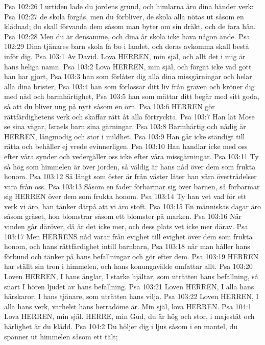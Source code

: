 Psa 102:26  I urtiden lade du jordens grund, och himlarna äro dina händer verk:
Psa 102:27  de skola förgås, men du förbliver, de skola alla nötas ut såsom en klädnad; du skall förvanda dem såsom man byter om sin dräkt, och de fara hän.
Psa 102:28  Men du är densamme, och dina år skola icke hava någon ände.
Psa 102:29  Dina tjänares barn skola få bo i landet, och deras avkomma skall bestå inför dig.
Psa 103:1  Av David. Lova HERREN, min själ, och allt det i mig är hans heliga namn.
Psa 103:2  Lova HERREN, min själ, och förgät icke vad gott han har gjort,
Psa 103:3  han som förlåter dig alla dina missgärningar och helar alla dina brister,
Psa 103:4  han som förlossar ditt liv från graven och kröner dig med nåd och barmhärtighet,
Psa 103:5  han som mättar ditt begär med sitt goda, så att du bliver ung på nytt såsom en örn.
Psa 103:6  HERREN gör rättfärdighetens verk och skaffar rätt åt alla förtryckta.
Psa 103:7  Han lät Mose se sina vägar, Israels barn sina gärningar.
Psa 103:8  Barmhärtig och nådig är HERREN, långmodig och stor i mildhet.
Psa 103:9  Han går icke ständigt till rätta och behåller ej vrede evinnerligen.
Psa 103:10  Han handlar icke med oss efter våra synder och vedergäller oss icke efter våra missgärningar.
Psa 103:11  Ty så hög som himmelen är över jorden, så väldig är hans nåd över dem som frukta honom.
Psa 103:12  Så långt som öster är från väster låter han våra överträdelser vara från oss.
Psa 103:13  Såsom en fader förbarmar sig över barnen, så förbarmar sig HERREN över dem som frukta honom.
Psa 103:14  Ty han vet vad för ett verk vi äro, han tänker därpå att vi äro stoft.
Psa 103:15  En människas dagar äro såsom gräset, hon blomstrar såsom ett blomster på marken.
Psa 103:16  När vinden går däröver, då är det icke mer, och dess plats vet icke mer därav.
Psa 103:17  Men HERRENS nåd varar från evighet till evighet över dem som frukta honom, och hans rättfärdighet intill barnbarn,
Psa 103:18  när man håller hans förbund och tänker på hans befallningar och gör efter dem.
Psa 103:19  HERREN har ställt sin tron i himmelen, och hans konungavälde omfattar allt.
Psa 103:20  Loven HERREN, I hans änglar, I starke hjältar, som uträtten hans befallning, så snart I hören ljudet av hans befallning.
Psa 103:21  Loven HERREN, I alla hans härskaror, I hans tjänare, som uträtten hans vilja.
Psa 103:22  Loven HERREN, I alla hans verk, varhelst hans herradöme är. Min själ, lova HERREN.
Psa 104:1  Lova HERREN, min själ. HERRE, min Gud, du är hög och stor, i majestät och härlighet är du klädd.
Psa 104:2  Du höljer dig i ljus såsom i en mantel, du spänner ut himmelen såsom ett tält;
